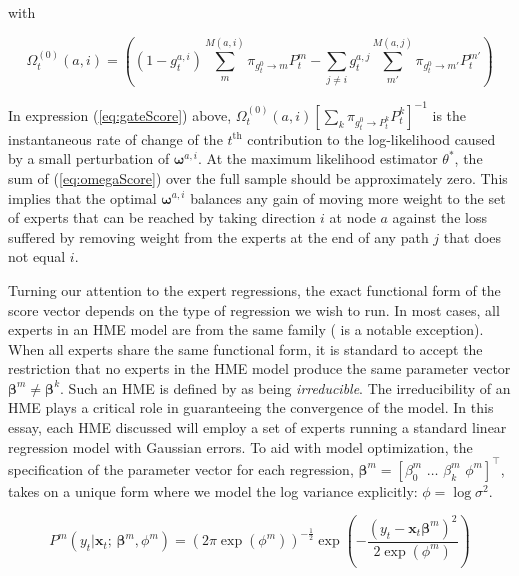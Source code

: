 \documentclass[12pt]{article}
\newcommand{\bw}[1]{\boldsymbol{\omega}^{#1}}
\newcommand{\gateprod}[2]{\pi_{#1 \longrightarrow #2}}
\newcommand{\FnOmegaNaught}[2]{\Omega^{(0)}_{t}( #1, #2 )}
\theoremstyle{definition}
\begin{document}
with

\begin{equation} \label{eq:omegaScore}
  \FnOmegaNaught{a}{i} = \left( (1 - g^{a, i}_{t}) \sum_{m}^{M(a, i)} \gateprod{g^{0}_{t}}{m} P^{m}_{t} - \sum_{j \neq i} g^{a, j}_{t} \sum_{m'}^{M(a, j)} \gateprod{g^{0}_{t}}{m'}  P^{m'}_{t} \right)
\end{equation}

In expression (\ref{eq:gateScore}) above, $ \FnOmegaNaught{a}{i} \left[ \sum_{k} \gateprod{g^{0}_{t}}{P^{k}_{t}} P^{k}_{t}\right]^{-1}$ is the instantaneous rate of change of the $t^{\mathrm{th}}$ contribution to the log-likelihood caused by a small perturbation of $\bw{a, i}$. At the maximum likelihood estimator $ \theta^{*}$, the sum of (\ref{eq:omegaScore}) over the full sample should be approximately zero. This implies that the optimal $\bw{a, i}$ balances any gain of moving more weight to the set of experts that can be reached by taking direction $i$ at node $a$ against the loss suffered by removing weight from the experts at the end of any path $j$ that does not equal $i$.

\bigskip

Turning our attention to the expert regressions, the exact functional form of the score vector depends on the type of regression we wish to run. In most cases, all experts in an HME model are from the same family (\citet{HuertaJiangTanner2003} is a notable exception). When all experts share the same functional form, it is standard to accept the restriction that no experts in the HME model produce the same parameter vector $\boldsymbol{\beta}^{m} \neq \boldsymbol{\beta}^{k}$. Such an HME is defined by \citet{JiangTanner2000} as being \textit{irreducible}. The irreducibility of an HME plays a critical role in guaranteeing the convergence of the model. In this essay, each HME discussed will employ a set of experts running a standard linear regression model with Gaussian errors. To aid with model optimization, the specification of the parameter vector for each regression,  $\boldsymbol{\beta}^{m} = [\beta_{0}^{m} \,\, \ldots \,\, \beta_{k}^m \,\, \phi^{m}]^{\top}$, takes on a unique form where we model the log variance explicitly: $\phi = \log \sigma^{2}$.

\begin{equation}
  P^{m}(y_{t} | \boldsymbol{x}_{t}; \, \boldsymbol{\beta}^{m}, \phi^{m}) = \left( 2 \pi \exp ( \phi^{m} ) \right)^{-\frac{1}{2}} \exp{ \left( -\frac{  ( y_{t} - \boldsymbol{x}_{t} \boldsymbol{\beta}^{m} )^{2}  }{2 \exp (\phi^{m}) } \right) }
\end{equation}
\end{document}
